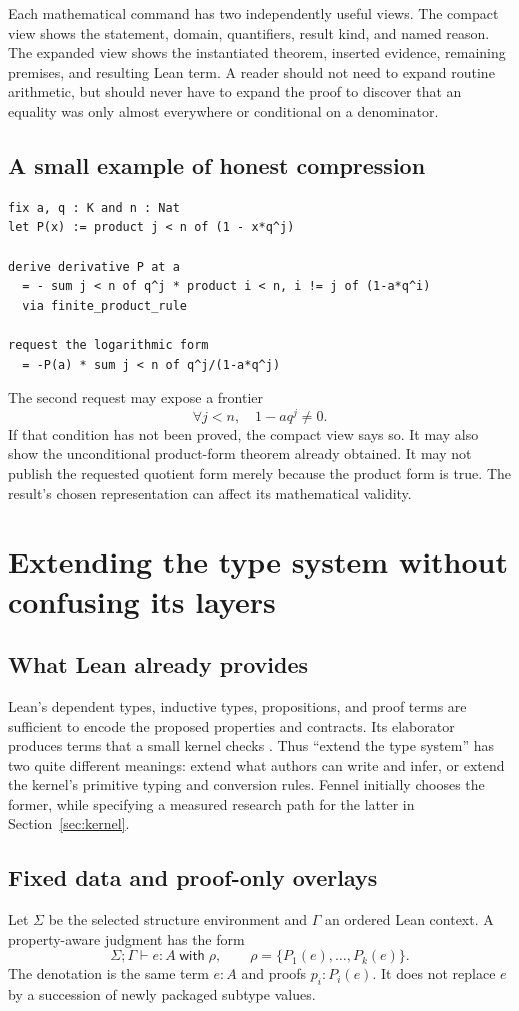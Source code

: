 \documentclass[11pt,a4paper]{article}
\theoremstyle{definition}
\theoremstyle{remark}
\begin{document}
Each mathematical command has two independently useful views. The compact
view shows the statement, domain, quantifiers, result kind, and named reason.
The expanded view shows the instantiated theorem, inserted evidence,
remaining premises, and resulting Lean term. A reader should not need to expand
routine arithmetic, but should never have to expand the proof to discover that
an equality was only almost everywhere or conditional on a denominator.

\subsection{A small example of honest compression}
\begin{lstlisting}
fix a, q : K and n : Nat
let P(x) := product j < n of (1 - x*q^j)

derive derivative P at a
  = - sum j < n of q^j * product i < n, i != j of (1-a*q^i)
  via finite_product_rule

request the logarithmic form
  = -P(a) * sum j < n of q^j/(1-a*q^j)
\end{lstlisting}
The second request may expose a frontier
\[
 \forall j<n,\quad 1-aq^j\ne0.
\]
If that condition has not been proved, the compact view says so. It may also
show the unconditional product-form theorem already obtained. It may not
publish the requested quotient form merely because the product form is true.
The result's chosen representation can affect its mathematical validity.

\section{Extending the type system without confusing its layers}
\label{sec:types}

\subsection{What Lean already provides}
Lean's dependent types, inductive types, propositions, and proof terms are
sufficient to encode the proposed properties and contracts. Its elaborator
produces terms that a small kernel checks \cite{leanTypes}. Thus ``extend the
type system'' has two quite different meanings: extend what authors can write
and infer, or extend the kernel's primitive typing and conversion rules.
Fennel initially chooses the former, while specifying a measured research
path for the latter in Section~\ref{sec:kernel}.

\subsection{Fixed data and proof-only overlays}
Let $\Sigma$ be the selected structure environment and $\Gamma$ an ordered Lean
context. A property-aware judgment has the form
\[
 \Sigma;\Gamma\vdash e:A\;\mathsf{with}\;\rho,
 \qquad \rho=\{P_1(e),\ldots,P_k(e)\}.
\]
The denotation is the same term $e:A$ and proofs $p_i:P_i(e)$. It does not
replace $e$ by a succession of newly packaged subtype values.
\end{document}

